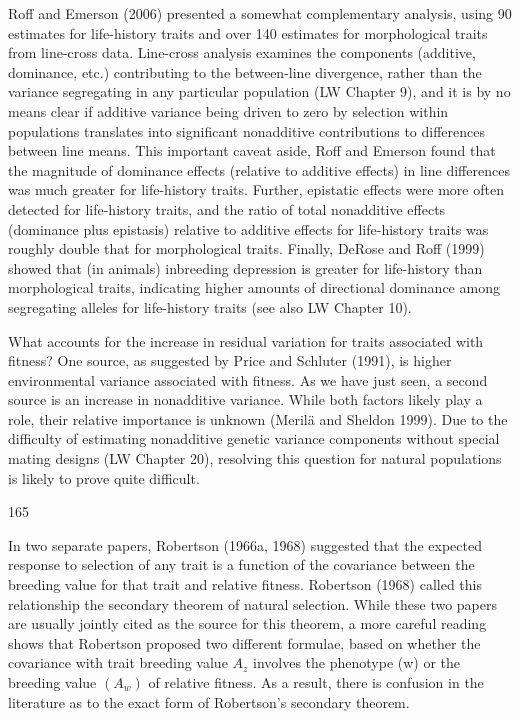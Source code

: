 \documentclass{article}
\begin{document}
Roff and Emerson (2006) presented a somewhat complementary analysis, using 90 estimates for life-history traits and over 140 estimates for morphological traits from line-cross data. Line-cross analysis examines the components (additive, dominance, etc.) contributing to the between-line divergence, rather than the variance segregating in any particular population (LW Chapter 9), and it is by no means clear if additive variance being driven to zero by selection within populations translates into significant nonadditive contributions to differences between line means. This important caveat aside, Roff and Emerson found that the magnitude of dominance effects (relative to additive effects) in line differences was much greater for life-history traits. Further, epistatic effects were more often detected for life-history traits, and the ratio of total nonadditive effects (dominance plus epistasis) relative to additive effects for life-history traits was roughly double that for morphological traits. Finally, DeRose and Roff (1999) showed that (in animals) inbreeding depression is greater for life-history than morphological traits, indicating higher amounts of directional dominance among segregating alleles for life-history traits (see also LW Chapter 10).

What accounts for the increase in residual variation for traits associated with fitness? One source, as suggested by Price and Schluter (1991), is higher environmental variance associated with fitness. As we have just seen, a second source is an increase in nonadditive variance. While both factors likely play a role, their relative importance is unknown (Merilä and Sheldon 1999). Due to the difficulty of estimating nonadditive genetic variance components without special mating designs (LW Chapter 20), resolving this question for natural populations is likely to prove quite difficult.

165

In two separate papers, Robertson (1966a, 1968) suggested that the expected response to selection of any trait is a function of the covariance between the breeding value for that trait and relative fitness. Robertson (1968) called this relationship the secondary theorem of natural selection. While these two papers are usually jointly cited as the source for this theorem, a more careful reading shows that Robertson proposed two different formulae, based on whether the covariance with trait breeding value  $ A_{z} $ involves the phenotype (w) or the breeding value  $ (A_{w}) $ of relative fitness. As a result, there is confusion in the literature as to the exact form of Robertson's secondary theorem.
\end{document}
